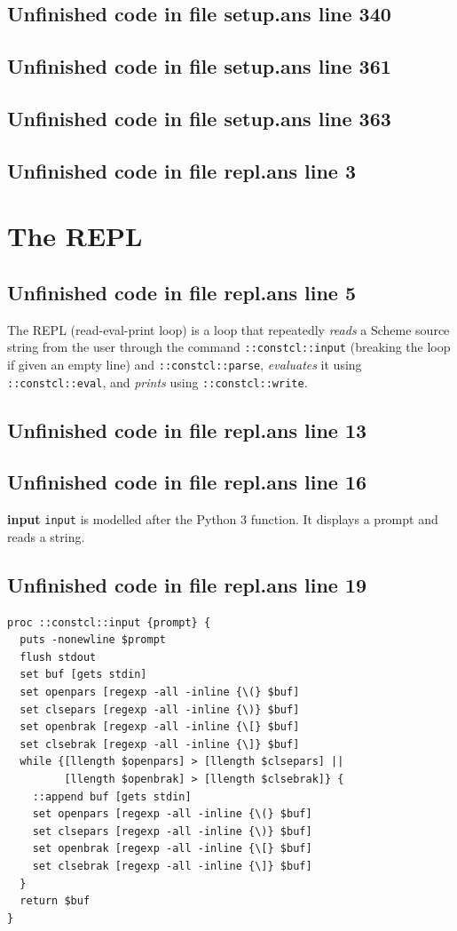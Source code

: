 \documentclass[twoside,9pt]{report}
\begin{document}
\section{Unfinished code in file setup.ans line 340}
\section{Unfinished code in file setup.ans line 361}
\section{Unfinished code in file setup.ans line 363}
\section{Unfinished code in file repl.ans line 3}
\chapter{The REPL}
\label{the-repl}
\section{Unfinished code in file repl.ans line 5}


The REPL (read-eval-print loop) is a loop that repeatedly \emph{reads} a Scheme source string from the user through the command \texttt{::constcl::input} (breaking the loop if given an empty line) and \texttt{::constcl::parse}, \emph{evaluates} it using \texttt{::constcl::eval}, and \emph{prints} using \texttt{::constcl::write}.

\section{Unfinished code in file repl.ans line 13}

\section{Unfinished code in file repl.ans line 16}

\textbf{input} \texttt{input} is modelled after the Python 3 function. It displays a prompt and reads a string.

\section{Unfinished code in file repl.ans line 19}
\begin{lstlisting}
proc ::constcl::input {prompt} {
  puts -nonewline $prompt
  flush stdout
  set buf [gets stdin]
  set openpars [regexp -all -inline {\(} $buf]
  set clsepars [regexp -all -inline {\)} $buf]
  set openbrak [regexp -all -inline {\[} $buf]
  set clsebrak [regexp -all -inline {\]} $buf]
  while {[llength $openpars] > [llength $clsepars] ||
         [llength $openbrak] > [llength $clsebrak]} {
    ::append buf [gets stdin]
    set openpars [regexp -all -inline {\(} $buf]
    set clsepars [regexp -all -inline {\)} $buf]
    set openbrak [regexp -all -inline {\[} $buf]
    set clsebrak [regexp -all -inline {\]} $buf]
  }
  return $buf
}
\end{lstlisting}
\end{document}
